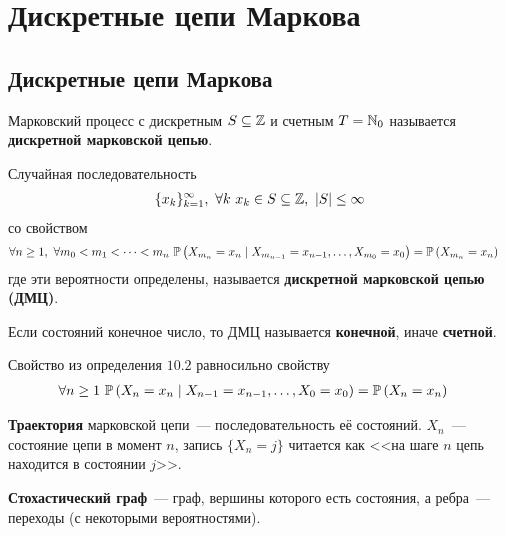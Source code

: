\section{Дискретные цепи Маркова}
\subsection{Дискретные цепи Маркова}
\begin{Def}
    Марковский процесс с дискретным $S \subseteq \mathbb{Z}$ и счетным $T = \mathbb{N}_0$
    называется \textbf{дискретной марковской цепью}.
\end{Def}
\begin{Def}
    Случайная последовательность
    \begin{align*}
      \{x_k\}_{k=1}^\infty, \ \forall k \ x_k \in S \subseteq \ZZ, \ \left| S \right|\leq \infty
    \end{align*}
    со свойством
    \begin{align*}
      & \forall n \geq 1, \ \forall m_0 < m_1 < \dots < m_n \ \mathbb{P}\left( X_{m_n} = x_n \mid X_{m_{n-1}} = x_{n-1}, \dots, X_{m_0} = x_0 \right) = \mathbb{P}\left( X_{m_n} = x_n \right)
    \end{align*}
    где эти вероятности определены, называется \textbf{дискретной марковской
      цепью (ДМЦ)}.
\end{Def}
\begin{Def}
    Если состояний конечное число, то ДМЦ называется \textbf{конечной}, иначе \textbf{счетной}.
\end{Def}
\begin{Note}
    Свойство из определения $10.2$ равносильно свойству
    \begin{align*}
      & \forall n \geq 1 \ \mathbb{P}\left( X_{n} = x_n \mid X_{n-1} = x_{n-1}, \dots, X_{0} = x_0 \right) = \mathbb{P}\left( X_{n} = x_n \right)
    \end{align*}  
\end{Note}
\begin{Def}
    \textbf{Траектория} марковской цепи~--- последовательность её состояний.
    $X_n$~--- состояние цепи в момент $n$, запись $\{X_n = j\}$ читается как
    <<на шаге $n$ цепь находится в состоянии $j$>>.
\end{Def}
\begin{Def}
    \textbf{Стохастический граф}~--- граф, вершины которого есть состояния, а
    ребра~--- переходы (с некоторыми вероятностями).
\end{Def}
